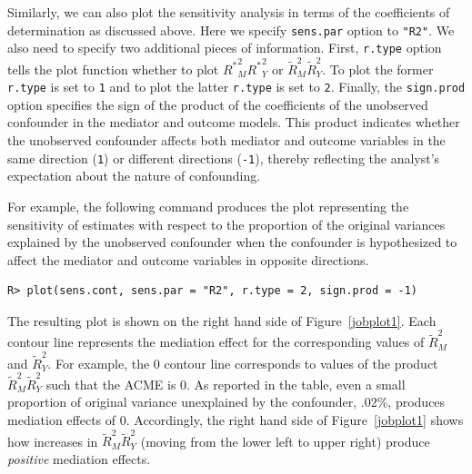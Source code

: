 \documentclass[11pt,letterpaper]{article}
\theoremstyle{plain}
\begin{document}

Similarly, we can also plot the sensitivity analysis in terms of the
coefficients of determination as discussed above. Here we specify \texttt{sens.par} 
option to \texttt{"R2"}.  We also need to specify two additional pieces of information.
First, \texttt{r.type} option tells the plot function whether to plot
${R^\ast}^2_M{R^\ast}^2_Y$ or $\widetilde{R}^2_M\widetilde{R}^2_Y$. To plot the
former \texttt{r.type} is set to \texttt{1} and to plot the latter \texttt{r.type} is set
to \texttt{2}.  Finally, the \texttt{sign.prod} option specifies the sign of the 
product of the coefficients of the unobserved confounder in the mediator and outcome models. 
This product indicates whether the unobserved confounder affects both mediator and outcome
variables in the same direction (\texttt{1}) or different directions (\texttt{-1}), thereby
reflecting the analyst's expectation about the nature of confounding.  

For example, the following command produces the plot representing the sensitivity
of estimates with respect to the proportion of the original variances explained by
the unobserved confounder when the confounder is hypothesized to affect the mediator
and outcome variables in opposite directions.
\begin{verbatim}
R> plot(sens.cont, sens.par = "R2", r.type = 2, sign.prod = -1)
\end{verbatim}
The resulting plot is shown on the right hand side of Figure~\ref{jobplot1}. Each contour
line represents the mediation effect for the corresponding values of
$\widetilde{R}^2_M$ and $\widetilde{R}^2_Y$. For example, the 0 contour line
corresponds to values of the product $\widetilde{R}^2_M\widetilde{R}^2_Y$ such
that the ACME is 0. As reported in the table, even a small proportion of
original variance unexplained by the confounder, $.02\%$, produces mediation
effects of 0.  Accordingly, the right hand side of Figure~\ref{jobplot1} shows
how increases in $\widetilde{R}^2_M\widetilde{R}^2_Y$ (moving from the lower
left to upper right) produce \emph{positive} mediation effects.
\end{document}

